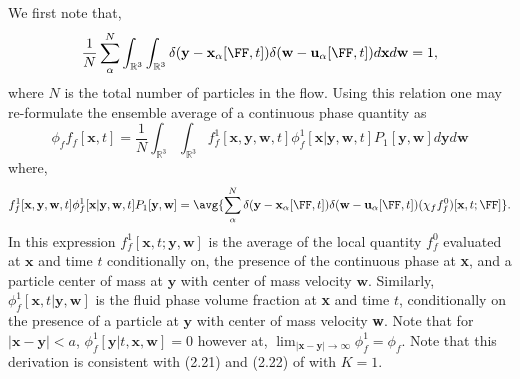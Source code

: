 We first note that, 
\begin{equation}
    \frac{1}{N}\sum_\alpha^N
    \int_{\mathbb{R}^3}
    \int_{\mathbb{R}^3}
    \delta(\textbf{y}-\textbf{x}_\alpha[\FF,t])
    \delta(\textbf{w}-\textbf{u}_\alpha[\FF,t])
    d\textbf{x}
    d\textbf{w}
    = 1,
\end{equation}
where $N$ is the total number of particles in the flow. 
Using this relation one may re-formulate the ensemble average of a continuous phase quantity as 
\begin{equation}
    \phi_f f_f[\textbf{x},t]
    = 
    \frac{1}{N}
    \int_{\mathbb{R}^3}
    \int_{\mathbb{R}^3}
    f_f^1[\textbf{x},\textbf{y},\textbf{w},t] \phi_f^1[\textbf{x}|\textbf{y},\textbf{w},t]  P_1[\textbf{y},\textbf{w}] 
    d\textbf{y} 
    d\textbf{w}
    \label{eq:conditional_averaged_fluid}
\end{equation}
where,
\begin{equation*}
    f_f^1[\textbf{x},\textbf{y},\textbf{w},t] \phi_f^1[\textbf{x}|\textbf{y},\textbf{w},t]  P_1[\textbf{y},\textbf{w}]
    =     
    \avg{
    \sum_\alpha^N 
    \delta(\textbf{y}-\textbf{x}_\alpha[\FF,t])
     \delta(\textbf{w}-\textbf{u}_\alpha[\FF,t])
    (\chi_f
    f^0_f)[\textbf{x},t;\FF]
    }.
\end{equation*}
In this expression $f_f^1[\textbf{x},t;\textbf{y},\textbf{w}]$ is the average of the local quantity $f_f^0$ evaluated at $\textbf{x}$ and time $t$ conditionally on, the presence of the continuous phase at \textbf{x}, and a particle center of mass at $\textbf{y}$ with center of mass velocity $\textbf{w}$. 
Similarly, $\phi_f^1[\textbf{x},t|\textbf{y},\textbf{w}]$ is the fluid phase volume fraction at \textbf{x} and time $t$, conditionally on the presence of a particle at $\textbf{y}$ with center of mass velocity \textbf{w}. 
Note that for $|\textbf{x} - \textbf{y}| < a$, $\phi_f^1[\textbf{y}|t,\textbf{x},\textbf{w}] = 0$ however at, 
$\lim_{|\textbf{x} - \textbf{y}| \to \infty} \phi_f^1 = \phi_f$. 
Note that this derivation is consistent with (2.21) and (2.22) of \citet{zhang1994ensemble} with $K = 1$. 

